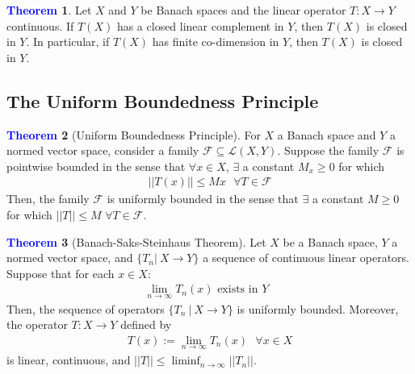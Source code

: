 \documentclass[11pt]{article}
\theoremstyle{definition}
\newcommand{\lop}[2]{\mathcal{L}(#1, #2)}
\theoremstyle{definition}
\newtheorem{theorem}{\textcolor{blue}{Theorem}}
\theoremstyle{definition}
\theoremstyle{remark}
\begin{document}
\begin{theorem}
	Let $X$ and $Y$ be Banach spaces and the linear operator $T: X \rightarrow Y$ continuous. If $T(X)$ has a closed linear complement in $Y$, then $T(X)$ is closed in $Y$. In particular, if $T(X)$ has finite co-dimension in $Y$, then $T(X)$ is closed in $Y$. 
\end{theorem}

\subsection{The Uniform Boundedness Principle}

\begin{theorem}[Uniform Boundedness Principle]
	For $X$ a Banach space and $Y$ a normed vector space, consider a family $\mathcal{F} \subseteq \lop{X}{Y}$. Suppose the family $\mathcal{F}$ is pointwise bounded in the sense that $\forall x \in X$, $\exists$ a constant $M_x \geq 0$ for which 
	\begin{align}
		|| T(x) || \leq M x \text{ 		} \forall T \in \mathcal{F} 	
	\end{align}
		Then, the family $\mathcal{F}$ is uniformly bounded in the sense that $\exists$ a constant $M \geq 0$ for which $ || T|| \leq M$ $\forall T \in \mathcal{F}$. 
\end{theorem}

\begin{theorem}[Banach-Saks-Steinhaus Theorem]
	Let $X$ be a Banach space, $Y$ a normed vector space, and $\{ T_n |\ X \rightarrow Y \}$ a sequence of continuous linear operators. Suppose that for each $x \in X$: 
	\begin{align}
		\lim_{n \rightarrow \infty} T_n(x) \text{ exists in $Y$ }	
	\end{align}
	Then, the sequence of operators $\{ T_n\ |\ X \rightarrow Y \}$ is uniformly bounded. Moreover, the operator $T: X \rightarrow Y$ defined by
	\begin{align}
		T(x) := \lim_{n \rightarrow \infty} T_n(x) \text{ 	} \forall x \in X 	
	\end{align}
	is linear, continuous, and $|| T || \leq \liminf_{n \rightarrow \infty} ||T_n||$. 
\end{theorem}
\end{document}
